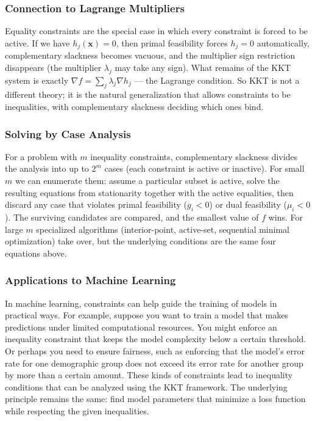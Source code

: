 \subsubsection*{Connection to Lagrange Multipliers}

\noindent Equality constraints are the special case in which every constraint is forced to be active. If we have $h_j(\mathbf{x}) = 0$, then primal feasibility forces $h_j = 0$ automatically, complementary slackness becomes vacuous, and the multiplier sign restriction disappears (the multiplier $\lambda_j$ may take any sign). What remains of the KKT system is exactly $\nabla f = \sum_j \lambda_j \nabla h_j$ --- the Lagrange condition. So KKT is not a different theory; it is the natural generalization that allows constraints to be inequalities, with complementary slackness deciding which ones bind.

\subsubsection*{Solving by Case Analysis}

\noindent For a problem with $m$ inequality constraints, complementary slackness divides the analysis into up to $2^m$ cases (each constraint is active or inactive). For small $m$ we can enumerate them: assume a particular subset is active, solve the resulting equations from stationarity together with the active equalities, then discard any case that violates primal feasibility ($g_i < 0$) or dual feasibility ($\mu_i < 0$). The surviving candidates are compared, and the smallest value of $f$ wins. For large $m$ specialized algorithms (interior-point, active-set, sequential minimal optimization) take over, but the underlying conditions are the same four equations above.

\subsubsection*{Applications to Machine Learning}

\noindent In machine learning, constraints can help guide the training of models in practical ways. For example, suppose you want to train a model that makes predictions under limited computational resources. You might enforce an inequality constraint that keeps the model complexity below a certain threshold. Or perhaps you need to ensure fairness, such as enforcing that the model’s error rate for one demographic group does not exceed its error rate for another group by more than a certain amount. These kinds of constraints lead to inequality conditions that can be analyzed using the KKT framework. The underlying principle remains the same: find model parameters that minimize a loss function while respecting the given inequalities.

